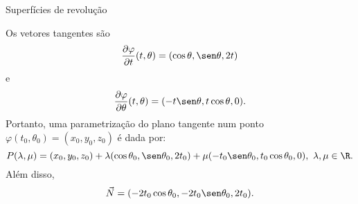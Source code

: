 \begin{example}{Superfícies de revolução}{}
\begin{center}
\begin{comment}
\draw[thick, green!150] (0,0,1)--(0,1,1) node[midway,above,rotate=-10]{\footnotesize$y(t)=t$}--(0,1,0)node[midway,right]{\footnotesize$z(t)=t^2$};
  
		\foreach \altura in {0.0125,0.025,...,1.5}{
			\pgfmathparse{sqrt(\altura)}
			\pgfmathsetmacro{\radio}{\pgfmathresult}
			\draw[blue!50,opacity=0.5] plot[domain=\tini:\tfin,smooth,variable=\t] ({\radio*cos(\t r)},{\radio*sin(\t r)},{\altura}); 
		}
		\draw[-latex] (0,0,0) -- (0,0,2.25) node [above] {$z$};	
		\foreach \altura in {0.0125,0.025,...,1.5}{
			\pgfmathparse{sqrt(\altura)}
			\pgfmathsetmacro{\radio}{\pgfmathresult}
			\draw[blue!50,opacity=0.5] plot[domain=\tfin:\tend,smooth,variable=\t] ({\radio*cos(\t r)},{\radio*sin(\t r)},{\altura}); 
		}
\draw[red,thick] plot[domain=-0.35*pi:pi/2,smooth,variable=\t] ({cos(\t r)},{sin(\t r)},{1.0}); 

\draw[yellow,very thick] plot[domain=0.1:sqrt(1.5),smooth,variable=\t] ({0},{\t},{\t*\t}); 



\draw[dashed,gray] ({cos(45)},{sin(45)},1) --({cos(45)},{sin(45)},0) --(0,0,0);  


\draw[red] plot[domain=0:pi/4,smooth,variable=\t] ({cos(\t r)/3},{sin(\t r)/3},{0}) node[midway,anchor=north]{\tiny$\theta$};


\filldraw[red!150] ({cos(45)},{sin(45)},1) circle (1pt);

\filldraw[yellow!150] (0,1,1) circle (1pt)node[right]{\footnotesize$(0,y(t),z(t))=(0,t,t^2)$};




	\end{tikzpicture}\end{comment}
\end{center}

Os vetores tangentes são
$$
\dfrac{\partial \varphi}{\partial t}(t,\theta)=(\cos\theta,\sen\theta,2t)
$$
e
$$\dfrac{\partial \varphi}{\partial \theta}(t,\theta) = (-t\sen\theta,t\cos\theta,0).$$
Portanto, uma parametrização do plano tangente num ponto $\varphi(t_0,\theta_0)=(x_0,y_0,z_0)$ é dada por:
$$P(\lambda,\mu)=(x_0,y_0,z_0)+\lambda (\cos\theta_0,\sen\theta_0,2t_0) + \mu (-t_0\sen\theta_0,t_0\cos\theta_0,0),~\lambda,\mu\in\R.$$
Além disso, 
$$\vec{N}=(-2t_0\cos \theta_0,-2t_0\sen \theta_0,2t_0).$$

\end{example}